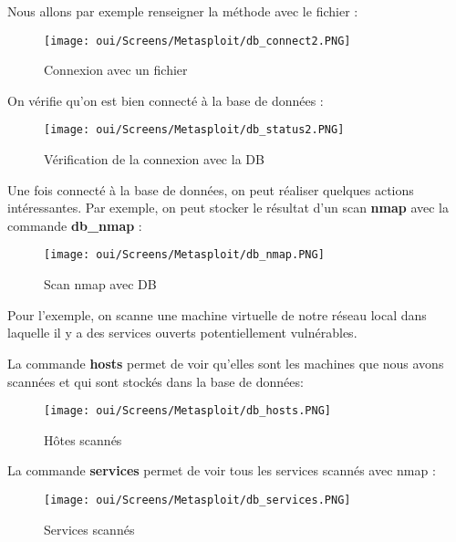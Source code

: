 \noindent Nous allons par exemple renseigner la méthode avec le fichier :

\begin{figure}[htp!]
  \centering
  \setlength\figureheight{7cm}
  \setlength\figurewidth{9cm}
  \texttt{[image: oui/Screens/Metasploit/db\_connect2.PNG]}
  \caption{Connexion avec un fichier}
  \label{fig:courbe-tikz}
\end{figure}

\noindent On vérifie qu'on est bien connecté à la base de données :

\begin{figure}[htp!]
  \centering
  \setlength\figureheight{7cm}
  \setlength\figurewidth{9cm}
  \texttt{[image: oui/Screens/Metasploit/db\_status2.PNG]}
  \caption{Vérification de la connexion avec la DB}
  \label{fig:courbe-tikz}
\end{figure}

Une fois connecté à la base de données, on peut réaliser quelques actions intéressantes. Par exemple, on peut stocker le résultat d'un scan \textbf{nmap} avec la commande \textbf{db\_nmap} :

\begin{figure}[htp!]
  \centering
  \setlength\figureheight{7cm}
  \setlength\figurewidth{9cm}
  \texttt{[image: oui/Screens/Metasploit/db\_nmap.PNG]}
  \caption{Scan nmap avec DB}
  \label{fig:courbe-tikz}
\end{figure}

Pour l'exemple, on scanne une machine virtuelle de notre réseau local dans laquelle il y a des services ouverts potentiellement vulnérables.

\noindent La commande \textbf{hosts} permet de voir qu'elles sont les machines que nous avons scannées et qui sont stockés dans la base de données:
\begin{figure}[htp!]
  \centering
  \setlength\figureheight{7cm}
  \setlength\figurewidth{9cm}
  \texttt{[image: oui/Screens/Metasploit/db\_hosts.PNG]}
  \caption{Hôtes scannés}
  \label{fig:courbe-tikz}
\end{figure}

\noindent La commande \textbf{services} permet de voir tous les services scannés avec nmap :

\begin{figure}[htp!]
  \centering
  \setlength\figureheight{7cm}
  \setlength\figurewidth{9cm}
  \texttt{[image: oui/Screens/Metasploit/db\_services.PNG]}
  \caption{Services scannés}
  \label{fig:courbe-tikz}
\end{figure}


